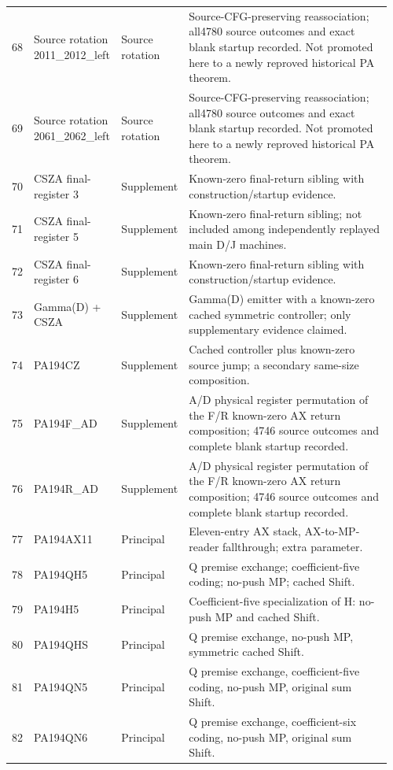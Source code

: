 \begin{longtable}{@{}p{0.035\linewidth}p{0.235\linewidth}p{0.135\linewidth}p{0.55\linewidth}@{}}
68 & Source rotation 2011\_\allowbreak{}2012\_\allowbreak{}left & Source rotation & Source-CFG-preserving reassociation; all4780 source outcomes and exact blank startup recorded. Not promoted here to a newly reproved historical PA theorem.\\[4pt]
69 & Source rotation 2061\_\allowbreak{}2062\_\allowbreak{}left & Source rotation & Source-CFG-preserving reassociation; all4780 source outcomes and exact blank startup recorded. Not promoted here to a newly reproved historical PA theorem.\\[4pt]
70 & CSZA final-register 3 & Supplement & Known-zero final-return sibling with construction/startup evidence.\\[4pt]
71 & CSZA final-register 5 & Supplement & Known-zero final-return sibling; not included among independently replayed main D/J machines.\\[4pt]
72 & CSZA final-register 6 & Supplement & Known-zero final-return sibling with construction/startup evidence.\\[4pt]
73 & Gamma(D) + CSZA & Supplement & Gamma(D) emitter with a known-zero cached symmetric controller; only supplementary evidence claimed.\\[4pt]
74 & PA194CZ & Supplement & Cached controller plus known-zero source jump; a secondary same-size composition.\\[4pt]
75 & PA194F\_\allowbreak{}AD & Supplement & A/D physical register permutation of the F/R known-zero AX return composition; 4746 source outcomes and complete blank startup recorded.\\[4pt]
76 & PA194R\_\allowbreak{}AD & Supplement & A/D physical register permutation of the F/R known-zero AX return composition; 4746 source outcomes and complete blank startup recorded.\\[4pt]
77 & PA194AX11 & Principal & Eleven-entry AX stack, AX-to-MP-reader fallthrough; extra parameter.\\[4pt]
78 & PA194QH5 & Principal & Q premise exchange; coefficient-five coding; no-push MP; cached Shift.\\[4pt]
79 & PA194H5 & Principal & Coefficient-five specialization of H: no-push MP and cached Shift.\\[4pt]
80 & PA194QHS & Principal & Q premise exchange, no-push MP, symmetric cached Shift.\\[4pt]
81 & PA194QN5 & Principal & Q premise exchange, coefficient-five coding, no-push MP, original sum Shift.\\[4pt]
82 & PA194QN6 & Principal & Q premise exchange, coefficient-six coding, no-push MP, original sum Shift.\\[4pt]
\bottomrule
\end{longtable}
\endgroup
